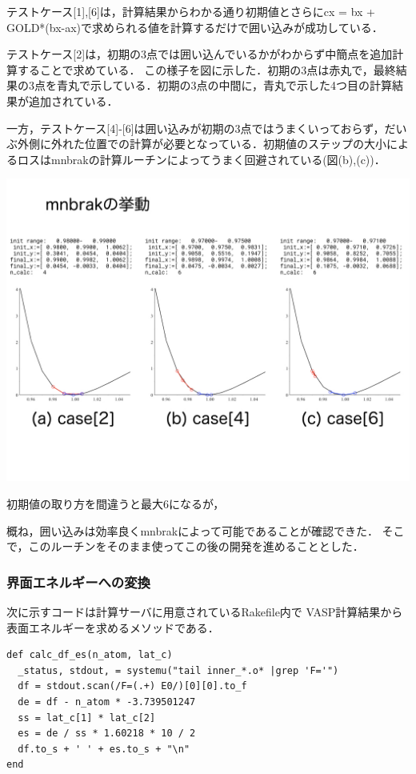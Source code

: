 \documentclass[11pt,dvipdfmx]{jsarticle}
\begin{document}
テストケース{[}1{]},{[}6{]}は，計算結果からわかる通り初期値とさらにcx =
bx + GOLD*(bx-ax)で求められる値を計算するだけで囲い込みが成功している．

テストケース{[}2{]}は，初期の3点では囲い込んでいるかがわからず中簡点を追加計算することで求めている．
この様子を図に示した．初期の3点は赤丸で，最終結果の3点を青丸で示している．初期の3点の中間に，青丸で示した4つ目の計算結果が追加されている．

一方，テストケース{[}4{]}-{[}6{]}は囲い込みが初期の3点ではうまくいっておらず，だいぶ外側に外れた位置での計算が必要となっている．初期値のステップの大小によるロスはmnbrakの計算ルーチンによってうまく回避されている(図(b),(c))．
\begin{center}
\includegraphics[width=150mm]{../.././figs/thesis_006.jpeg}
\end{center}
初期値の取り方を間違うと最大6になるが，

\label{fig:}
概ね，囲い込みは効率良くmnbrakによって可能であることが確認できた．
そこで，このルーチンをそのまま使ってこの後の開発を進めることとした．

    \subsubsection{界面エネルギーへの変換}\label{ux754cux9762ux30a8ux30cdux30ebux30aeux30fcux3078ux306eux5909ux63db}

次に示すコードは計算サーバに用意されているRakefile内で
VASP計算結果から表面エネルギーを求めるメソッドである．

\begin{verbatim}
def calc_df_es(n_atom, lat_c)
  _status, stdout, = systemu("tail inner_*.o* |grep 'F='")
  df = stdout.scan(/F=(.+) E0/)[0][0].to_f
  de = df - n_atom * -3.739501247
  ss = lat_c[1] * lat_c[2]
  es = de / ss * 1.60218 * 10 / 2
  df.to_s + ' ' + es.to_s + "\n"
end
\end{verbatim}
\end{document}

